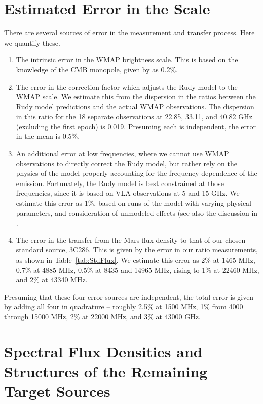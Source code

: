 \documentclass{aastex}
\begin{document}
\section{Estimated Error in the Scale}

There are several sources of error in the measurement and transfer
process.  Here we quantify these. 

\begin{enumerate}
\item The intrinsic error in the WMAP brightness scale.  This is based
  on the knowledge of the CMB monopole, given by \citet{Jar11} as
  0.2\%. 
\item The error in the correction factor which adjusts the Rudy model
  to the WMAP scale.  We estimate this from the
  dispersion in the ratios between the Rudy model predictions and
  the actual WMAP observations.  The dispersion in this ratio for the
  18 separate observations at 22.85, 33.11, and 40.82 GHz (excluding
  the first epoch) is 0.019.  Presuming each is independent, the
  error in the mean is 0.5\%.    
\item An additional error at low frequencies, where we cannot use WMAP
  observations to directly correct the Rudy model, but rather rely on
  the physics of the model properly accounting for the frequency
  dependence of the emission.  Fortunately, the  Rudy model is best
  constrained at those frequencies, since it is based on VLA
  observations at 5 and 15 GHz.  We estimate this error as 1\%, based
  on runs of the model with varying physical parameters, and
  consideration of unmodeled effects (see also the discussion in
  \citet{Muh91}.
\item The error in the transfer from the Mars flux density to that of
  our chosen standard source, 3C286. This is given by the error in our
  ratio measurements, as shown in Table~\ref{tab:StdFlux}.  We
  estimate this error as 2\% at 1465 MHz, 0.7\% at 4885 MHz, 0.5\% at
  8435 and 14965 MHz, rising to 1\% at 22460 MHz, and 2\% at 43340
  MHz.     
\end{enumerate}

Presuming that these four error sources are independent, the total
error is given by adding all four in quadrature -- roughly 2.5\% at
1500 MHz, 1\% from 4000 through 15000 MHz, 2\% at 22000 MHz, and 3\%
at 43000 GHz.    


\section{Spectral Flux Densities and Structures of the Remaining Target Sources}
\end{document}
